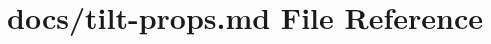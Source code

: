 \hypertarget{tilt-props_8md}{\section{docs/tilt-\/props.md File Reference}
\label{tilt-props_8md}
}
